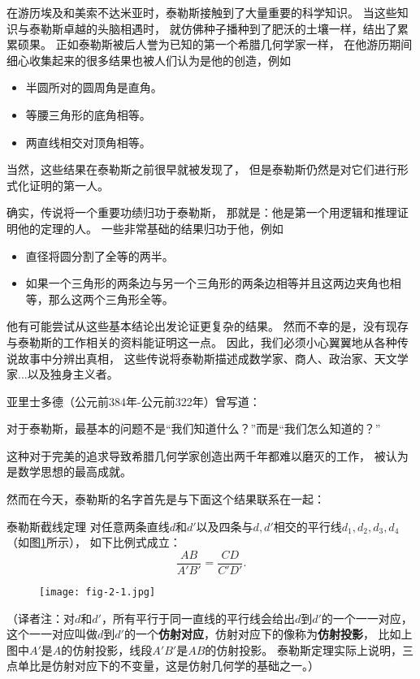 \documentclass[cn,fancy,blue,11pt]{elegantbook}
\begin{document}
在游历埃及和美索不达米亚时，泰勒斯接触到了大量重要的科学知识。
当这些知识与泰勒斯卓越的头脑相遇时，
就仿佛种子播种到了肥沃的土壤一样，结出了累累硕果。
正如泰勒斯被后人誉为已知的第一个希腊几何学家一样，
在他游历期间细心收集起来的很多结果也被人们认为是他的创造，例如
\begin{itemize}
	\item 半圆所对的圆周角是直角。
	\item 等腰三角形的底角相等。
	\item 两直线相交对顶角相等。
\end{itemize}
当然，这些结果在泰勒斯之前很早就被发现了，
但是泰勒斯仍然是对它们进行形式化证明的第一人。

确实，传说将一个重要功绩归功于泰勒斯，
那就是：他是第一个用逻辑和推理证明他的定理的人。
一些非常基础的结果归功于他，例如
\begin{itemize}
	\item 直径将圆分割了全等的两半。
	\item 如果一个三角形的两条边与另一个三角形的两条边相等并且这两边夹角也相等，那么这两个三角形全等。
\end{itemize}
他有可能尝试从这些基本结论出发论证更复杂的结果。
然而不幸的是，没有现存与泰勒斯的工作相关的资料能证明这一点。
因此，我们必须小心翼翼地从各种传说故事中分辨出真相，
这些传说将泰勒斯描述成数学家、商人、政治家、天文学家...以及独身主义者。

亚里士多德（公元前384年-公元前322年）曾写道：
\begin{framed}
	对于泰勒斯，最基本的问题不是``我们知道什么？''而是``我们怎么知道的？''
\end{framed}
这种对于完美的追求导致希腊几何学家创造出两千年都难以磨灭的工作，
被认为是数学思想的最高成就。

然而在今天，泰勒斯的名字首先是与下面这个结果联系在一起：

\begin{theorem*}{泰勒斯截线定理}{}
	对任意两条直线$d$和$d'$以及四条与$d,d'$相交的平行线$d_1,d_2,d_3,d_4$（如图\ref{fig:2-1}所示），
	如下比例式成立：
	\[\frac{AB}{A'B'}=\frac{CD}{C'D'}.\]
\end{theorem*}

\begin{figure}[htbp]
	\centering
	\texttt{[image: fig-2-1.jpg]}
	\caption{\label{fig:2-1}}
\end{figure}

（译者注：对$d$和$d'$，所有平行于同一直线的平行线会给出$d$到$d'$的一个一一对应，
这个一一对应叫做$d$到$d'$的一个\textbf{仿射对应}，仿射对应下的像称为\textbf{仿射投影}，
比如上图中$A'$是$A$的仿射投影，线段$A'B'$是$AB$的仿射投影。
泰勒斯定理实际上说明，三点单比是仿射对应下的不变量，这是仿射几何学的基础之一。）
\vskip 10pt
\end{document}
